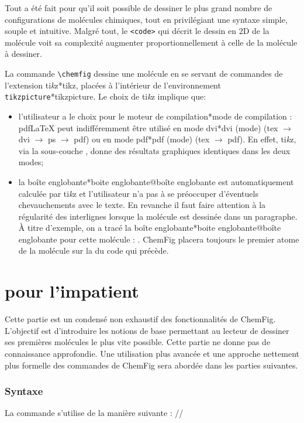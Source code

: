 \documentclass[10pt]{article}
\makeatletter
\newcommand\idx{\@ifstar{\let\print@or@not\@gobble\idx@}{\let\print@or@not\@firstofone\idx@}}
\newcommand\idx@[1]{%
	\ifcat\expandafter\noexpand\@car#1\@nil\relax%
		\expandafter\ifx\@car#1\@nil\protect
			\index{#1}%
			\print@or@not{#1}%
		\else
			\saveexpandmode\expandarg
			\StrSubstitute{\string#1}{\string @}{\@empty\protect\symbol{'100}}[\temp@]%
			\StrGobbleLeft\temp@1[\temp@]%
			\restoreexpandmode
			\expandafter\index\expandafter{\temp@ @\protect\texttt{\protect\textbackslash\temp@}}%
			\print@or@not{\texttt{\string#1}}%
		\fi
	\else
		\index{#1}%
		\print@or@not{#1}%
	\fi
}
\newcommand\CF{{\ECFAugie ChemFig}\xspace}
\newcommand\TIKZ{ti\textit kz\xspace}
\makeatother
\begin{document}
Tout a été fait pour qu'il soit possible de dessiner le plus grand nombre de configurations de molécules chimiques, tout en privilégiant une syntaxe simple, souple et intuitive. Malgré tout, le \verb-<code>- qui décrit le dessin en 2D de la molécule voit sa complexité augmenter proportionnellement à celle de la molécule à dessiner.

La commande \verb|\chemfig| dessine une molécule en se servant de commandes de l'extension \TIKZ\idx*{tikz}, placées à l'intérieur de l'environnement \verb|tikzpicture|\idx*{tikzpicture}. Le choix de \TIKZ implique que:
\begin{itemize}
\item l'utilisateur a le choix pour le moteur de compilation\idx*{mode de compilation} : pdf\LaTeX{} peut indifféremment être utilisé en mode dvi\idx*{dvi (mode)} (tex $\longrightarrow$ dvi $\longrightarrow$ ps $\longrightarrow$ pdf) ou en mode pdf\idx*{pdf (mode)} (tex $\longrightarrow$ pdf). En effet, \TIKZ, via la sous-couche \idx{pgf}, donne des résultats graphiques identiques dans les deux modes;
\item la boîte englobante\idx*{boite englobante@boîte englobante} est automatiquement calculée par \TIKZ et l'utilisateur n'a pas à se préoccuper d'éventuels chevauchements avec le texte. En revanche il faut faire attention à la régularité des interlignes lorsque la molécule est dessinée dans un paragraphe. À titre d'exemple, on a tracé la boîte englobante\idx*{boite englobante@boîte englobante} pour cette molécule : { }. \CF placera toujours le premier atome de la molécule sur la \idx{ligne de base} du code qui précède.
\end{itemize}
\newpage

\part{\protect\CF pour l'impatient}
Cette partie est un condensé non exhaustif des fonctionnalités de \CF. L'objectif est d'introduire les notions de base permettant au lecteur de dessiner ses premières molécules le plus vite possible. Cette partie ne donne pas de connaissance approfondie. Une utilisation plus avancée et une approche nettement plus formelle des commandes de \CF sera abordée dans les parties suivantes.

\section{Syntaxe}
La commande \idx{\chemfig} s'utilise de la manière suivante :
\centerverb//
\end{document}
